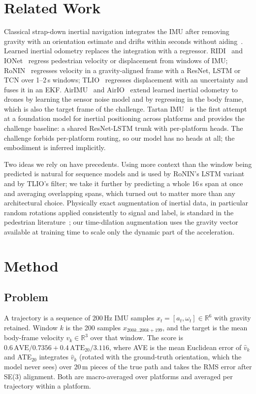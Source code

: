 \documentclass[letterpaper,10pt,conference]{ieeeconf}
\begin{document}
\section{Related Work}
Classical strap-down inertial navigation integrates the IMU after removing gravity with an orientation estimate and
drifts within seconds without aiding~\cite{titterton}. Learned inertial odometry replaces the integration with a
regressor. RIDI~\cite{ridi} and IONet~\cite{ionet} regress pedestrian velocity or displacement from windows of IMU;
RoNIN~\cite{ronin} regresses velocity in a gravity-aligned frame with a ResNet, LSTM or TCN over 1--2\,s windows;
TLIO~\cite{tlio} regresses displacement with an uncertainty and fuses it in an EKF. AirIMU~\cite{airimu} and
AirIO~\cite{airio} extend learned inertial odometry to drones by learning the sensor noise model and by regressing in
the body frame, which is also the target frame of the challenge. Tartan IMU~\cite{tartanimu} is the first attempt at
a foundation model for inertial positioning across platforms and provides the challenge baseline: a shared ResNet-LSTM
trunk with per-platform heads. The challenge forbids per-platform routing, so our model has no heads at all; the
embodiment is inferred implicitly.

Two ideas we rely on have precedents. Using more context than the window being predicted is natural for sequence
models and is used by RoNIN's LSTM variant and by TLIO's filter; we take it further by predicting a whole 16\,s span
at once and averaging overlapping spans, which turned out to matter more than any architectural choice. Physically
exact augmentation of inertial data, in particular random rotations applied consistently to signal and label, is
standard in the pedestrian literature~\cite{ronin}; our time-dilation augmentation uses the gravity vector available
at training time to scale only the dynamic part of the acceleration.

\section{Method}
\subsection{Problem}
A trajectory is a sequence of 200\,Hz IMU samples $x_t = [a_t, \omega_t] \in \mathbb{R}^6$ with gravity retained.
Window $k$ is the 200 samples $x_{200k..200k+199}$, and the target is the mean body-frame velocity $v_k \in
\mathbb{R}^3$ over that window. The score is $0.6\,\mathrm{AVE}/0.7356 + 0.4\,\mathrm{ATE}_{20}/3.116$, where AVE is
the mean Euclidean error of $\hat v_k$ and ATE$_{20}$ integrates $\hat v_k$ (rotated with the ground-truth orientation,
which the model never sees) over 20\,m pieces of the true path and takes the RMS error after SE(3) alignment. Both
are macro-averaged over platforms and averaged per trajectory within a platform.
\end{document}
